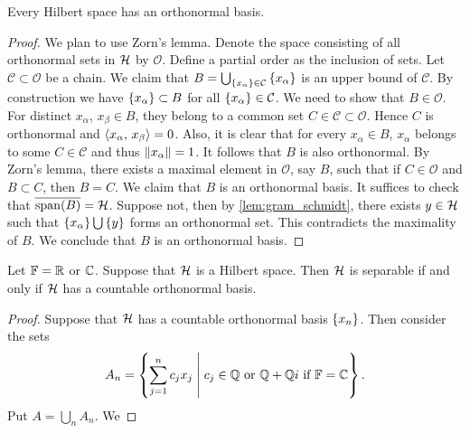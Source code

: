 \begin{theorem}
    Every Hilbert space has an orthonormal basis.
\end{theorem}
\begin{proof}
    We plan to use Zorn's lemma. Denote the space consisting of all orthonormal 
    sets in $\mathcal{H}$ by $\mathcal{O}$. Define a partial order as the inclusion of 
    sets. Let $\mathcal{C}\subset\mathcal{O}$ be a chain. We claim that 
    $B = \bigcup_{\left\{ {x_\alpha} \right\}\in\mathcal{C}}\left\{ {x_\alpha} \right\}$ is an upper bound 
    of $\mathcal{C}$. By construction we have $\left\{ {x_\alpha} \right\}\subset B$ for all 
    $\left\{ {x_\alpha} \right\}\in\mathcal{C}$. We need to show that $B\in\mathcal{O}$. For 
    distinct $x_\alpha$, $x_\beta\in B$, they belong to a common set 
    $C\in\mathcal{C}\subset\mathcal{O}$. Hence $C$ is orthonormal and 
    $\left\langle {x_\alpha},\, {x_\beta} \right\rangle = 0$. Also, it is clear that for every $x_\alpha\in B$, 
    $x_\alpha$ belongs to some $C\in\mathcal{C}$ and thus $\left\lVert {x_\alpha} \right\rVert = 1$. 
    It follows that $B$ is also orthonormal. By Zorn's lemma, there exists a 
    maximal element in $\mathcal{O}$, say $B$, such that if $C\in\mathcal{O}$ 
    and $B\subset C$, then $B = C$. We claim that $B$ is an orthonormal basis. 
    It suffices to check that $\overline{\operatorname{span}(B)} = \mathcal{H}$. Suppose not, then 
    by \cref{lem:gram_schmidt}, there exists $y\in\mathcal{H}$ such that $\left\{ {x_\alpha} \right\}\bigcup\left\{ {y} \right\}$ 
    forms an orthonormal set. This contradicts the maximality of $B$. We 
    conclude that $B$ is an orthonormal basis.
\end{proof}

\begin{theorem}
    Let $\mathbb{F} = \mathbb{R}$ or $\mathbb{C}$. Suppose that $\mathcal{H}$ is a Hilbert space. Then $\mathcal{H}$ 
    is separable if and only if $\mathcal{H}$ has a countable orthonormal basis.
\end{theorem}
\begin{proof}
    Suppose that $\mathcal{H}$ has a countable orthonormal basis $\left\{ {x_n} \right\}$. Then consider 
    the sets
    \begin{equation*}
        A_n = \left\{ \sum_{j=1}^n c_jx_j \;\middle\vert\; c_j\in\mathbb{Q}\text{ or }\mathbb{Q}+\mathbb{Q}i\text{ if $\mathbb{F} = \mathbb{C}$} \right\}.
    \end{equation*}
    Put $A = \bigcup_n A_n$. We 
\end{proof}

